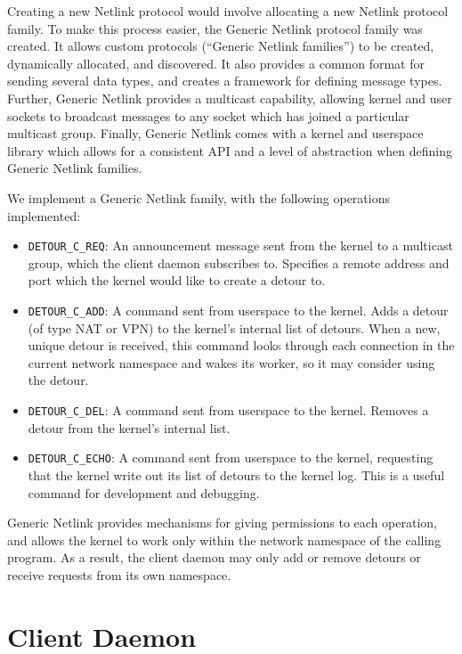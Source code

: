 \documentclass{cwru}
\begin{document}
Creating a new Netlink protocol would involve allocating a new Netlink protocol
family. To make this process easier, the Generic Netlink protocol family was
created. It allows custom protocols (``Generic Netlink families'') to be
created, dynamically allocated, and discovered. It also provides a common format
for sending several data types, and creates a framework for defining message
types. Further, Generic Netlink provides a multicast capability, allowing kernel
and user sockets to broadcast messages to any socket which has joined a
particular multicast group. Finally, Generic Netlink comes with a kernel and
userspace library which allows for a consistent API and a level of abstraction
when defining Generic Netlink families.

We implement a Generic Netlink family, with the following operations
implemented:

\begin{itemize}
\item \texttt{DETOUR\_C\_REQ}: An announcement message sent from the kernel to a
  multicast group, which the client daemon subscribes to. Specifies a remote
  address and port which the kernel would like to create a detour to.
\item \texttt{DETOUR\_C\_ADD}: A command sent from userspace to the kernel. Adds
  a detour (of type NAT or VPN) to the kernel's internal list of detours. When a
  new, unique detour is received, this command looks through each connection in
  the current network namespace and wakes its worker, so it may consider using
  the detour.
\item \texttt{DETOUR\_C\_DEL}: A command sent from userspace to the kernel.
  Removes a detour from the kernel's internal list.
\item \texttt{DETOUR\_C\_ECHO}: A command sent from userspace to the kernel,
  requesting that the kernel write out its list of detours to the kernel log.
  This is a useful command for development and debugging.
\end{itemize}

Generic Netlink provides mechanisms for giving permissions to each operation,
and allows the kernel to work only within the network namespace of the calling
program. As a result, the client daemon may only add or remove detours or
receive requests from its own namespace.

\section{Client Daemon}
\end{document}
